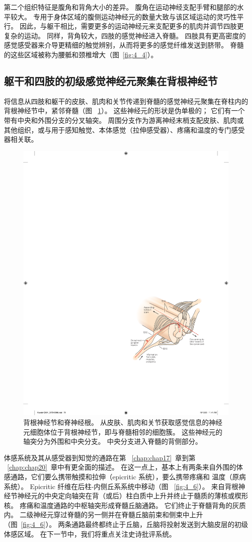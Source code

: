 第二个组织特征是腹角和背角大小的差异。
腹角在运动神经支配手臂和腿部的水平较大。
专用于身体区域的腹侧运动神经元的数量大致与该区域运动的灵巧性平行。
因此，与躯干相比，需要更多的运动神经元来支配更多的肌肉并调节四肢更复杂的运动。
同样，背角较大，四肢的感觉神经进入脊髓。
四肢具有更高密度的感觉感受器来介导更精细的触觉辨别，从而将更多的感觉纤维发送到脐带。
脊髓的这些区域被称为腰骶和颈椎增大（图~\ref{fig:4_4}）。



\subsection{躯干和四肢的初级感觉神经元聚集在背根神经节}

将信息从四肢和躯干的皮肤、肌肉和关节传递到脊髓的感觉神经元聚集在脊柱内的背根神经节中，紧邻脊髓（图 ~\ref{fig:4_5}）。 
这些神经元的形状是伪单极的；
它们有一个带有中央和外围分支的分叉轴突。
周围分支作为游离神经末梢支配皮肤、肌肉或其他组织，或与用于感知触觉、本体感觉（拉伸感受器）、疼痛和温度的专门感受器相关联。


\begin{figure}[htbp]
	\centering
	\includegraphics[width=0.5\linewidth]{chap04/fig_4_5}
	\caption{背根神经节和脊神经根。 
		从皮肤、肌肉和关节获取感觉信息的神经元细胞体位于背根神经节，即与脊髓相邻的细胞簇。 
		这些神经元的轴突分为外围和中央分支。 
		中央分支进入脊髓的背侧部分。}
	\label{fig:4_5}
\end{figure}


体感系统及其从感受器到知觉的通路在第 ~\ref{chap:chap17}~章到第 ~\ref{chap:chap20}~章中有更全面的描述。
在这一点上，基本上有两条来自外围的体感通路，它们要么携带触摸和拉伸（epicritic 系统），要么携带疼痛和 温度（原病系统）。
Epicritic 纤维在后柱-内侧丘系系统中移动（图 ~\ref{fig:4_6}）。
来自背根神经节神经元的中央定向轴突在背（或后）柱白质中上升并终止于髓质的薄核或楔形核。
疼痛和温度通路的中枢轴突形成脊髓丘脑通路。
它们终止于脊髓背角的灰质内。
二级神经元穿过脊髓的另一侧并在脊髓丘脑前束和侧束中上升（图~\ref{fig:4_6}）。 
两条通路最终都终止于丘脑，丘脑将投射发送到大脑皮层的初级体感区域。
在下一节中，我们将重点关注史诗批评系统。


